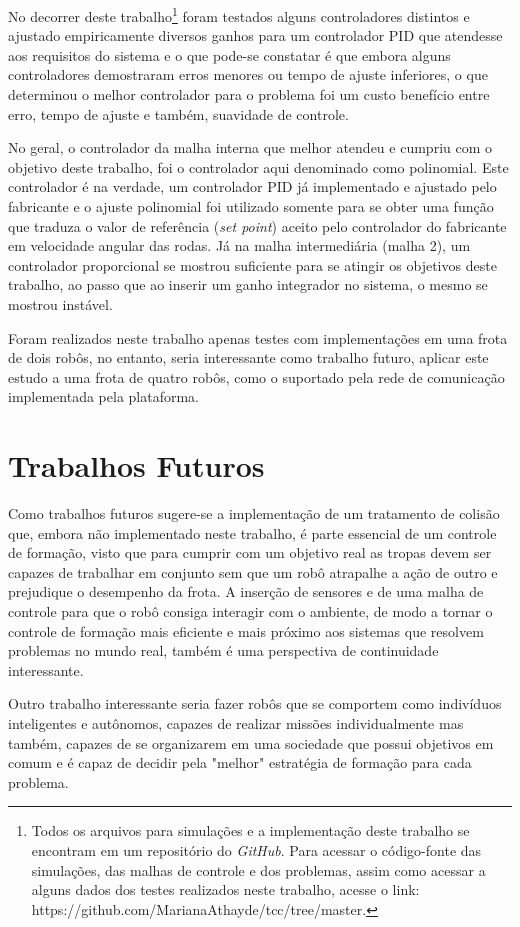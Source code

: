 No decorrer deste trabalho\footnote{Todos os arquivos para simulações e a implementação deste trabalho se encontram em um repositório do \emph{GitHub}. Para acessar o código-fonte das simulações, das malhas de controle e dos problemas, assim como acessar a alguns dados dos testes realizados neste trabalho, acesse o link: https://github.com/MarianaAthayde/tcc/tree/master.} foram testados alguns controladores distintos e ajustado empiricamente diversos ganhos para um controlador PID que atendesse aos requisitos do sistema e o que pode-se constatar é que embora alguns controladores demostraram erros menores ou tempo de ajuste inferiores, o que determinou o melhor controlador para o problema foi um custo benefício entre erro, tempo de ajuste e também, suavidade de controle. 

No geral, o controlador da malha interna que melhor atendeu e cumpriu com o objetivo deste trabalho, foi o controlador aqui denominado como polinomial. %
Este controlador é na verdade, um controlador PID já implementado e ajustado pelo fabricante e o ajuste polinomial foi utilizado somente para se obter uma função que traduza o valor de referência (\emph{set point}) aceito pelo controlador do fabricante em velocidade angular das rodas. Já na malha intermediária (malha 2), um controlador proporcional se mostrou suficiente para se atingir os objetivos deste trabalho, ao passo que ao inserir um ganho integrador no sistema, o mesmo se mostrou instável.

Foram realizados neste trabalho apenas testes com implementações em uma frota de dois robôs, no entanto, seria interessante como trabalho futuro, aplicar este estudo a uma frota de quatro robôs, como o suportado pela rede de comunicação implementada pela plataforma. 

\section{Trabalhos Futuros}
 \label{sec:trabFuturos}
 Como trabalhos futuros sugere-se a implementação de um tratamento de colisão que, embora não implementado neste trabalho, é parte essencial de um controle de formação, visto que para cumprir com um objetivo real as tropas devem ser capazes de trabalhar em conjunto sem que um robô atrapalhe a ação de outro e prejudique o desempenho da frota. A inserção de sensores e de uma malha de controle para que o robô consiga interagir com o ambiente, de modo a tornar o controle de formação mais eficiente e mais próximo aos sistemas que resolvem problemas no mundo real, também é uma perspectiva de continuidade interessante.
 
 Outro trabalho interessante seria fazer robôs que se comportem como indivíduos inteligentes e autônomos, capazes de realizar missões individualmente mas também, capazes de se organizarem em uma sociedade que possui objetivos em comum e é capaz de decidir pela "melhor" estratégia de formação para cada problema.
 

